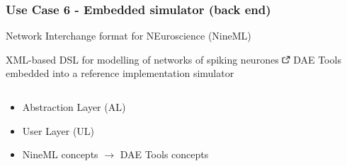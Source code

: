 \documentclass[compress,newPxFont,sthlmFooter]{beamer}
\begin{document}
\begin{frame}[plain]
\frametitle{Use Case 6 - Embedded simulator (back end)}
    \begin{center}
        \alert{Network Interchange format for NEuroscience (NineML)}
    \end{center}   
    \small{XML-based DSL for modelling of networks of spiking neurones 
                \href{http://software.incf.org/software/nineml}{\includegraphics[align=b, height=0.8em]{link.png}}
                } \linebreak
    \small{DAE Tools embedded into a \alert{reference implementation simulator}}
    \begin{columns}[c]
      \begin{column}{0.50\paperwidth}
        {\scriptsize
         \begin{itemize}
            \item \alert{Abstraction Layer (AL)}
            \item \alert{User Layer (UL)}
            \item NineML concepts $\rightarrow$ DAE Tools concepts
        \end{itemize}
        }
      \end{column}
      

\end{columns}
\end{frame}
\end{document}
